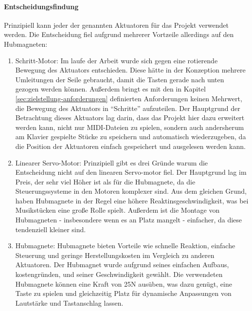 \paragraph{Entscheidungsfindung}
Prinzipiell kann jeder der genannten Aktuatoren für das Projekt verwendet werden. Die Entscheidung fiel aufgrund
mehrerer Vortzeile allerdings auf den Hubmagneten:
\begin{enumerate}
	\item Schritt-Motor: Im laufe der Arbeit wurde sich gegen eine rotierende Bewegung des Aktuators entschieden. Diese
	hätte in der Konzeption mehrere Umleitungen der Seile gebraucht, damit die Tasten gerade nach unten gezogen werden können.
	Außerdem bringt es mit den in Kapitel \ref{sec:zielstellung-anforderungen} definierten Anforderungen keinen Mehrwert,
	die Bewegung des Aktuators in \enquote{Schritte} aufzuteilen. Der Hauptgrund der Betrachtung dieses Aktuators lag darin,
	dass das Projekt hier dazu erweitert werden kann, nicht nur MIDI-Dateien zu spielen, sondern auch andersherum am Klavier
	gespielte Stücke zu speichern und automatisch wiederzugeben, da die Position der Aktuatoren einfach gespeichert und
	ausgelesen werden kann. %
	\item Linearer Servo-Motor: Prinzipiell gibt es drei Gründe warum die Entscheidung nicht auf den linearen Servo-motor fiel.
	Der Hauptgrund lag im Preis, der sehr viel Höher ist als für die Hubmagnete, da die Steuerungssysteme in den Motoren komplexer sind.
	Aus dem gleichen Grund, haben Hubmagnete in der Regel eine höhere Reaktinsgeschwindigkeit, was bei Musikstücken eine
	große Rolle spielt.
	Außerdem ist die Montage von Hubmagneten - insbesondere wenn es an Platz mangelt - einfacher, da diese tendenziell
	kleiner sind. %
	\item Hubmagnete: Hubmagnete bieten Vorteile wie schnelle Reaktion, einfache Steuerung und geringe
	Herstellungskosten im Vergleich zu anderen Aktuatoren. Der Hubmagnet wurde aufgrund seines einfachen Aufbaus,
	kostengründen, und seiner Geschwindigkeit gewählt. Die verwendeten Hubmagnete können eine Kraft von 25N ausüben,
	was dazu genügt, eine Taste  zu spielen und gleichzeitig Platz für dynamische Anpassungen von Lautstärke und
	Tastanschlag lassen.
\end{enumerate}

